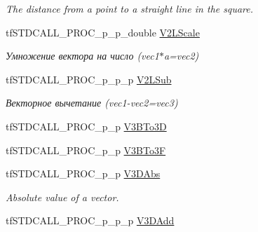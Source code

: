 \begin{DoxyCompactItemize}
\begin{DoxyCompactList}\small\item\em The distance from a point to a straight line in the square. \end{DoxyCompactList}\item 
\hypertarget{structs_functions_vector_c_p_u_a8a4d14ecbbb1492648b63c532b6e7fe7}{tf\-S\-T\-D\-C\-A\-L\-L\-\_\-\-P\-R\-O\-C\-\_\-p\-\_\-p\-\_\-double \hyperlink{structs_functions_vector_c_p_u_a8a4d14ecbbb1492648b63c532b6e7fe7}{V2\-L\-Scale}}\label{structs_functions_vector_c_p_u_a8a4d14ecbbb1492648b63c532b6e7fe7}

\begin{DoxyCompactList}\small\item\em Умножение вектора на число (vec1$\ast$a=vec2) \end{DoxyCompactList}\item 
\hypertarget{structs_functions_vector_c_p_u_a06e6f2cfce2893aa4ef00a81cd2deef3}{tf\-S\-T\-D\-C\-A\-L\-L\-\_\-\-P\-R\-O\-C\-\_\-p\-\_\-p\-\_\-p \hyperlink{structs_functions_vector_c_p_u_a06e6f2cfce2893aa4ef00a81cd2deef3}{V2\-L\-Sub}}\label{structs_functions_vector_c_p_u_a06e6f2cfce2893aa4ef00a81cd2deef3}

\begin{DoxyCompactList}\small\item\em Векторное вычетание (vec1-\/vec2=vec3) \end{DoxyCompactList}\item 
tf\-S\-T\-D\-C\-A\-L\-L\-\_\-\-P\-R\-O\-C\-\_\-p\-\_\-p \hyperlink{structs_functions_vector_c_p_u_aecdb09a4a3e938d5bb02df86f7f86a7b}{V3\-B\-To3\-D}
\item 
tf\-S\-T\-D\-C\-A\-L\-L\-\_\-\-P\-R\-O\-C\-\_\-p\-\_\-p \hyperlink{structs_functions_vector_c_p_u_a418119f77b1c35d3067d4233df779776}{V3\-B\-To3\-F}
\item 
\hypertarget{structs_functions_vector_c_p_u_ae3d605711af219061047f3254ced84af}{tf\-S\-T\-D\-C\-A\-L\-L\-\_\-\-P\-R\-O\-C\-\_\-p\-\_\-p \hyperlink{structs_functions_vector_c_p_u_ae3d605711af219061047f3254ced84af}{V3\-D\-Abs}}\label{structs_functions_vector_c_p_u_ae3d605711af219061047f3254ced84af}

\begin{DoxyCompactList}\small\item\em Absolute value of a vector. \end{DoxyCompactList}\item 
\hypertarget{structs_functions_vector_c_p_u_a412d30dd57e745ad97fe0c3a8712ab52}{tf\-S\-T\-D\-C\-A\-L\-L\-\_\-\-P\-R\-O\-C\-\_\-p\-\_\-p\-\_\-p \hyperlink{structs_functions_vector_c_p_u_a412d30dd57e745ad97fe0c3a8712ab52}{V3\-D\-Add}}\label{structs_functions_vector_c_p_u_a412d30dd57e745ad97fe0c3a8712ab52}


\end{DoxyCompactItemize}
